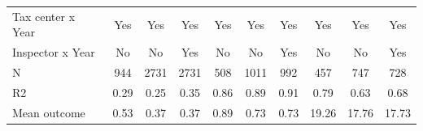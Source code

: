 \begin{tabular}{lccc|ccc|ccc}
\midrule
Tax center x Year&         Yes         &         Yes         &         Yes         &         Yes         &         Yes         &         Yes         &         Yes         &         Yes         &         Yes         \\
Inspector x Year&          No         &          No         &         Yes         &          No         &          No         &         Yes         &          No         &          No         &         Yes         \\
N           &         944         &        2731         &        2731         &         508         &        1011         &         992         &         457         &         747         &         728         \\
R2          &        0.29         &        0.25         &        0.35         &        0.86         &        0.89         &        0.91         &        0.79         &        0.63         &        0.68         \\
Mean outcome&        0.53         &        0.37         &        0.37         &        0.89         &        0.73         &        0.73         &       19.26         &       17.76         &       17.73         \\
\bottomrule \end{tabular}
